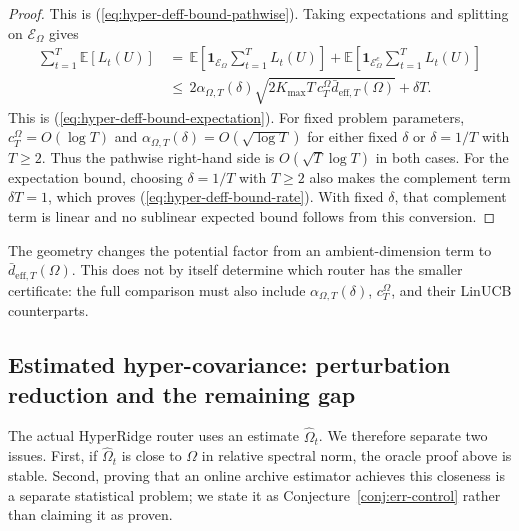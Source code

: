 \documentclass{article} %
\renewcommand{\eqref}[1]{\textup{(\ref{#1})}}
\begin{document}
\begin{proof}
This is \eqref{eq:hyper-deff-bound-pathwise}.  Taking expectations and splitting on \(\mathcal{E}_{\Omega}\) gives
\begin{equation}
\label{eq:hyper-deff-proof-expectation-split}
\begin{aligned}
\sum_{t=1}^{T}\mathbb{E}[L_t(U)]
&\,=\,
\mathbb{E}
\!\left[
\mathbf{1}_{\mathcal{E}_{\Omega}}
\sum_{t=1}^{T}L_t(U)
\right]
+
\mathbb{E}
\!\left[
\mathbf{1}_{\mathcal{E}_{\Omega}^{c}}
\sum_{t=1}^{T}L_t(U)
\right]
\\
&\,\leq\,
2\alpha_{\Omega,T}(\delta)
\sqrt{
2K_{\max}T\,c_T^\Omega
\bar d_{\mathrm{eff},T}(\Omega)
}
+\delta T .
\end{aligned}
\end{equation}
This is \eqref{eq:hyper-deff-bound-expectation}. For fixed problem
parameters, \(c_T^\Omega=O(\log T)\) and
\(\alpha_{\Omega,T}(\delta)=O(\sqrt{\log T})\) for either fixed \(\delta\)
or \(\delta=1/T\) with \(T\ge2\). Thus the pathwise right-hand side is
\(O(\sqrt T\log T)\) in both cases. For the expectation bound, choosing
\(\delta=1/T\) with \(T\ge2\) also makes the complement term \(\delta T=1\), which proves
\eqref{eq:hyper-deff-bound-rate}. With fixed \(\delta\), that complement term
is linear and no sublinear expected bound follows from this conversion.
\end{proof}

The geometry changes the potential factor from an ambient-dimension term to
\(\bar d_{\mathrm{eff},T}(\Omega)\). This does not by itself determine which
router has the smaller certificate: the full comparison must also include
\(\alpha_{\Omega,T}(\delta)\), \(c_T^\Omega\), and their LinUCB counterparts.

\subsection{Estimated hyper-covariance: perturbation reduction and the remaining gap}
\label{sec:theory-estimated-hyper}

The actual HyperRidge router uses an estimate \(\widehat{\Omega}_t\).  We therefore separate two issues.  First, if \(\widehat{\Omega}_t\) is close to \(\Omega\) in relative spectral norm, the oracle proof above is stable.  Second, proving that an online archive estimator achieves this closeness is a separate statistical problem; we state it as Conjecture~\ref{conj:err-control} rather than claiming it as proven.
\end{document}
